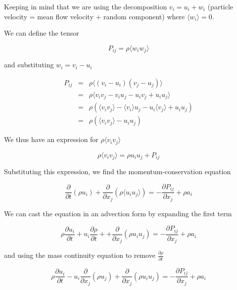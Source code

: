 \noindent Keeping in mind that we are using the decomposition $v_i = u_i + w_i$ (particle velocity = mean flow velocity + random component) where $\langle w_i \rangle = 0$.


\noindent We can define the tensor

\begin{equation}
P_{ij} = \rho \langle w_i w_j\rangle
\end{equation}

\noindent and substituting $w_i = v_i - u_i$

\begin{eqnarray}
P_{ij} &=& \rho \langle (v_i - u_i)(v_j - u_j)\rangle\\
&=&\rho \langle v_iv_j - v_i u_j - u_iv_j + u_iu_j\rangle\\
&=&\rho \left(\langle v_iv_j\rangle - \langle v_i \rangle u_j - u_i\langle v_j\rangle + u_iu_j\right)\\
&=&\rho \left(\langle v_iv_j\rangle - u_iu_j\right)
\end{eqnarray}

\noindent We thus have an expression for $\rho\langle v_i  v_j \rangle$


\begin{equation}
\rho \langle v_iv_j\rangle = \rho u_iu_j + P_{ij}
\end{equation}


\noindent Substituting this expression, we find the momentum-conservation equation 

\begin{equation}
\boxed{
\frac{\partial }{\partial t} \left(\rho u_i \right) + \frac{\partial}{\partial x_j} \left(\rho\langle u_i  u_j \rangle\right) = -\frac{\partial P_{ij}}{\partial x_j}  + \rho a_i 
}
\end{equation}


\noindent We can cast the equation in an advection form by expanding the first term  


\begin{equation}
\rho \frac{\partial u_i}{\partial t} + u_i \frac{\partial \rho}{\partial t} +  + \frac{\partial}{\partial x_j} \left(\rho u_i  u_j \right) = -\frac{\partial P_{ij}}{\partial x_j}  + \rho a_i 
\end{equation}

\noindent and using the mass continuity equation to remove $\frac{\partial \rho}{\partial t}$


\begin{equation}
\rho \frac{\partial u_i}{\partial t} - u_i \frac{\partial}{\partial x_j} \left(\rho u_j\right)  + \frac{\partial}{\partial x_j} \left(\rho u_i  u_j \right) = -\frac{\partial P_{ij}}{\partial x_j}  + \rho a_i 
\end{equation}

